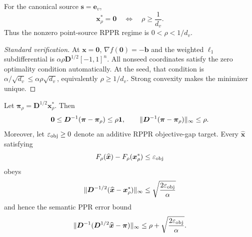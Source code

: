 \documentclass[11pt]{article}
\begin{document}
\begin{proposition}
\label{prop:problem-definitions-rppr-zero-regime}
For the canonical source $\bm{s}=\bm{e}_v$,
\begin{equation}
    \bm{x}_\rho^*=\bm{0}
    \quad\Longleftrightarrow\quad
    \rho\geq\frac{1}{d_v}.
    \label{eq:problem-definitions-rppr-zero-regime}
\end{equation}
Thus the nonzero point-source RPPR regime is $0<\rho<1/d_v$.
\end{proposition}

\begin{proof}[Standard verification]
At $\bm{x}=\bm{0}$, $\nabla f(\bm{0})=-\bm{b}$ and the weighted
$\ell_1$ subdifferential is
$\alpha\rho\bm{D}^{1/2}[-1,1]^n$.  All nonseed coordinates satisfy the
zero optimality condition automatically.  At the seed, that condition is
$\alpha/\sqrt{d_v}\leq\alpha\rho\sqrt{d_v}$, equivalently
$\rho\geq1/d_v$.  Strong convexity makes the minimizer unique.
\end{proof}

\begin{proposition}
\label{prop:problem-definitions-rppr-bias}
Let $\bm{\pi}_\rho=\bm{D}^{1/2}\bm{x}_\rho^*$. Then
\begin{equation}
    \bm{0}
    \leq \bm{D}^{-1}(\bm{\pi}-\bm{\pi}_\rho)
    \leq \rho\mathbf{1},
    \qquad
    \lVert\bm{D}^{-1}(\bm{\pi}-\bm{\pi}_\rho)\rVert_\infty\leq\rho.
    \label{eq:problem-definitions-rppr-bias}
\end{equation}
Moreover, let $\varepsilon_{\mathrm{obj}}\geq0$ denote an additive RPPR objective-gap target.
Every $\widehat{\bm{x}}$ satisfying
\begin{equation}
    F_\rho(\widehat{\bm{x}})-F_\rho(\bm{x}_\rho^*)\leq\varepsilon_{\mathrm{obj}}
    \label{eq:problem-definitions-rppr-objective-gap}
\end{equation}
obeys
\begin{equation}
    \lVert\bm{D}^{-1/2}
      (\widehat{\bm{x}}-\bm{x}_\rho^*)\rVert_\infty
    \leq\sqrt{\frac{2\varepsilon_{\mathrm{obj}}}{\alpha}}
    \label{eq:problem-definitions-rppr-objective-to-solution}
\end{equation}
and hence the semantic PPR error bound
\begin{equation}
    \lVert\bm{D}^{-1}
      (\bm{D}^{1/2}\widehat{\bm{x}}-\bm{\pi})\rVert_\infty
    \leq\rho+\sqrt{\frac{2\varepsilon_{\mathrm{obj}}}{\alpha}}.
    \label{eq:problem-definitions-rppr-total-error}
\end{equation}
\end{proposition}
\end{document}
